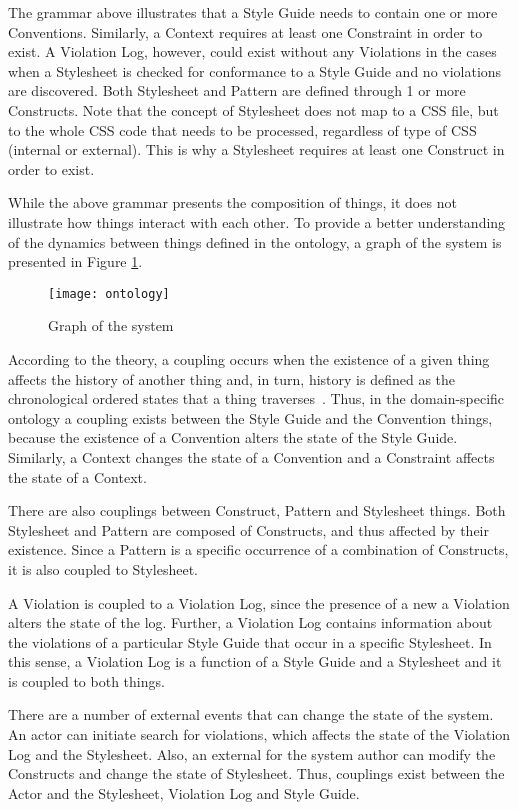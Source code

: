\documentclass[parskip=full]{uvamscse}
\begin{document}
The grammar above illustrates that a Style Guide needs to contain one or more Conventions. Similarly,
a Context requires at least one Constraint in order to exist. A Violation Log, however, could exist
without any Violations in the cases when a Stylesheet is checked for conformance to a Style Guide
and no violations are discovered. Both Stylesheet and Pattern are defined through 1 or more
Constructs. Note that the concept of Stylesheet does not map to a CSS file, but to the whole CSS
code that needs to be processed, regardless of type of CSS (internal or external). This is why a
Stylesheet requires at least one Construct in order to exist.

While the above grammar presents the composition of things, it does not illustrate how things
interact with each other. To provide a better understanding of the dynamics between things defined
in the ontology, a graph of the system is presented in Figure \ref{fig:couplings}.

\begin{figure}[h!]
  \centering
  \caption{Graph of the system}
  \label{fig:couplings}
  \texttt{[image: ontology]}
\end{figure}

According to the theory, a coupling occurs when the existence of a given thing affects the history
of another thing and, in turn, history is defined as the chronological ordered states that a thing
traverses~\cite{wand1990ontological}. Thus, in the domain-specific ontology a coupling exists
between the Style Guide and the Convention things, because the existence of a Convention alters the
state of the Style Guide. Similarly, a Context changes the state of a Convention and a Constraint
affects the state of a Context.

There are also couplings between Construct, Pattern and Stylesheet things. Both Stylesheet and
Pattern are composed of Constructs, and thus affected by their existence. Since a Pattern is a
specific occurrence of a combination of Constructs, it is also coupled to Stylesheet.

A Violation is coupled to a Violation Log, since the presence of a new a Violation alters the state
of the log. Further, a Violation Log contains information about the violations of a particular Style
Guide that occur in a specific Stylesheet. In this sense, a Violation Log is a function of a Style
Guide and a Stylesheet and it is coupled to both things.

There are a number of external events that can change the state of the system. An actor can initiate search for violations, which affects the state of the Violation Log and the Stylesheet. Also, an external for the system author can modify the Constructs and change the state of Stylesheet. Thus, couplings exist between the Actor and the Stylesheet, Violation Log and Style Guide.
\end{document}
